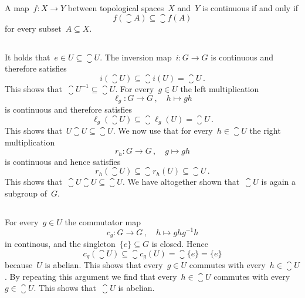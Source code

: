 \section{}


\begin{recall}
  A map~$f \colon X \to Y$ between topological spaces~$X$ and~$Y$ is continuous if and only if
  \[
    f( \closure{A} )
    \subseteq
    \closure{f(A)}
  \]
  for every subset~$A \subseteq X$.
\end{recall}





\subsection{}

It holds that~$e \in U \subseteq \closure{U}$.
The inversion map~$i \colon G \to G$ is continuous and therefore satisfies
\[
  i(\closure{U})
  \subseteq
  \closure{ i(U) }
  =
  \closure{U} \,.
\]
This shows that~$\closure{U}^{-1} \subseteq \closure{U}$.
For every~$g \in U$ the left multiplication
\[
  \ell_g
  \colon
  G
  \to
  G \,,
  \quad
  h
  \mapsto
  gh
\]
is continuous and therefore satisfies
\[
  \ell_g( \closure{U} )
  \subseteq
  \closure{ \ell_g(U) }
  =
  \closure{U} \,.
\]
This shows that~$U \closure{U} \subseteq \closure{U}$.
We now use that for every~$h \in \closure{U}$ the right multiplication
\[
  r_h
  \colon
  G
  \to
  G \,,
  \quad
  g
  \mapsto
  gh
\]
is continuous and hence satisfies
\[
  r_h( \closure{U} )
  \subseteq
  \closure{ r_h(U) }
  \subseteq
  \closure{U} \,.
\]
This shows that~$\closure{U} \closure{U} \subseteq \closure{U}$.
We have altogether shown that~$\closure{U}$ is again a subgroup of~$G$.





\subsection{}

For every~$g \in U$ the commutator map
\[
  c_g
  \colon
  G
  \to
  G \,,
  \quad
  h
  \mapsto
  g h g^{-1} h
\]
in continous, and the singleton~$\{e\} \subseteq G$ is closed.
Hence
\[
  c_g(\closure{U})
  \subseteq
  \closure{ c_g(U) }
  =
  \closure{ \{e\} }
  =
  \{e\}
\]
because~$U$ is abelian.
This shows that every~$g \in U$ commutes with every~$h \in \closure{U}$.
By repeating this argument we find that every~$h \in \closure{U}$ commutes with every~$g \in \closure{U}$.
This shows that~$\closure{U}$ is abelian.




